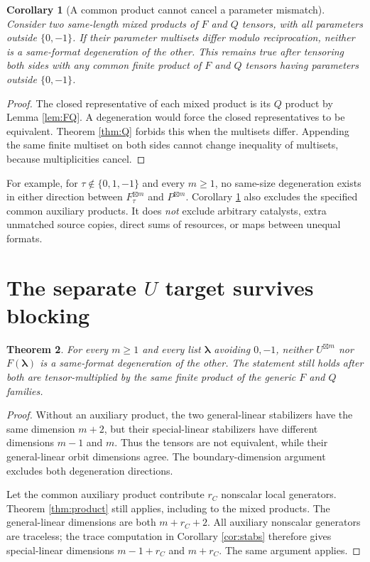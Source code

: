 \documentclass[11pt]{article}
\newtheorem{theorem}{Theorem}[section]
\newtheorem{corollary}[theorem]{Corollary}
\theoremstyle{remark}\newtheorem{remark}[theorem]{Remark}
\newcommand{\gp}{\boxtimes}
\begin{document}
\begin{corollary}[A common product cannot cancel a parameter mismatch]\label{cor:catalyst}
Consider two same-length mixed products of $F$ and $Q$ tensors, with all parameters outside $\{0,-1\}$. If their parameter multisets differ modulo reciprocation, neither is a same-format degeneration of the other. This remains true after tensoring both sides with any common finite product of $F$ and $Q$ tensors having parameters outside $\{0,-1\}$.
\end{corollary}
\begin{proof}
The closed representative of each mixed product is its $Q$ product by Lemma \ref{lem:FQ}. A degeneration would force the closed representatives to be equivalent. Theorem \ref{thm:Q} forbids this when the multisets differ. Appending the same finite multiset on both sides cannot change inequality of multisets, because multiplicities cancel.
\end{proof}

For example, for $\tau\notin\{0,1,-1\}$ and every $m\geq1$, no same-size degeneration exists in either direction between $F_\tau^{\gp m}$ and $P^{\gp m}$. Corollary \ref{cor:catalyst} also excludes the specified common auxiliary products. It does \emph{not} exclude arbitrary catalysts, extra unmatched source copies, direct sums of resources, or maps between unequal formats.

\section{The separate \texorpdfstring{$U$}{U} target survives blocking}\label{sec:U}
\begin{theorem}\label{thm:Useparate}
For every $m\geq1$ and every list $\boldsymbol\lambda$ avoiding $0,-1$, neither $U^{\gp m}$ nor $F(\boldsymbol\lambda)$ is a same-format degeneration of the other. The statement still holds after both are tensor-multiplied by the same finite product of the generic $F$ and $Q$ families.
\end{theorem}
\begin{proof}
Without an auxiliary product, the two general-linear stabilizers have the same dimension $m+2$, but their special-linear stabilizers have different dimensions $m-1$ and $m$. Thus the tensors are not equivalent, while their general-linear orbit dimensions agree. The boundary-dimension argument excludes both degeneration directions.

Let the common auxiliary product contribute $r_C$ nonscalar local generators. Theorem \ref{thm:product} still applies, including to the mixed products. The general-linear dimensions are both $m+r_C+2$. All auxiliary nonscalar generators are traceless; the trace computation in Corollary \ref{cor:stabs} therefore gives special-linear dimensions $m-1+r_C$ and $m+r_C$. The same argument applies.
\end{proof}
\end{document}
